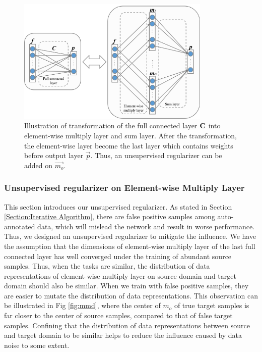 \documentclass[runningheads]{llncs}
\begin{document}
\begin{figure}
\centering
\includegraphics[height=6cm]{images/elementwiselayer.png}
\caption{Illustration of transformation of the full connected layer ${\bf C}$ into element-wise multiply layer and sum layer. After the transformation, the element-wise layer become the last layer which contains weights before output layer $\vec{p}$. Thus, an unsupervised regularizer can be added on $\vec{m_{o}}$.}
\label{fig:elementwiselayer}
\end{figure}

\subsubsection{Unsupervised regularizer on Element-wise Multiply Layer}

This section introduces our unsupervised regularizer. As stated in Section \ref{Section:Iterative Algorithm}, there are false positive samples among auto-annotated data, which will mislead the network and result in worse performance. Thus, we designed an unsupervised regularizer to mitigate the influence. We have the assumption that the dimensions of element-wise multiply layer of the last full connected layer has well converged under the training of abundant source samples. Thus, when the tasks are similar, the distribution of data representations of element-wise multiply layer on source domain and target domain should also be similar. When we train with false positive samples, they are easier to mutate the distribution of data representations. This observation can be illustrated in Fig \ref{fig:mmd}, where the center of $m_{o}$ of true target samples is far closer to the center of source samples, compared to that of false target samples. Confining that the distribution of data representations between source and target domain to be similar helps to reduce the influence caused by data noise to some extent.
\end{document}
